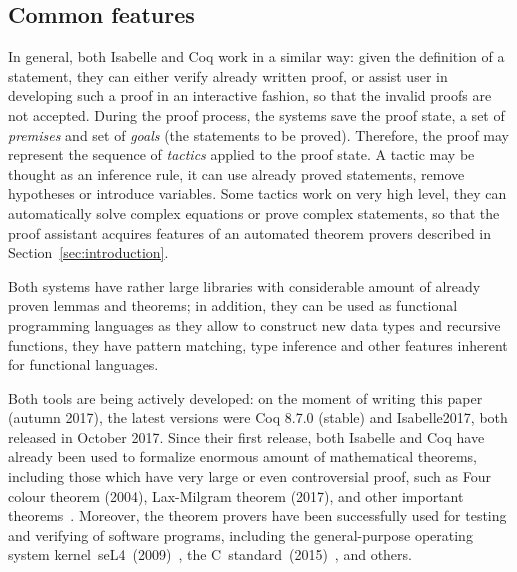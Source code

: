\documentclass[article]{aaltoseries}
\begin{document}


\subsection{Common features}

In general, both Isabelle and Coq work in a similar way: given the definition of a statement, they can either verify already written proof, or assist user in developing such a proof in an interactive fashion, so that the invalid proofs are not accepted.
During the proof process, the systems save the proof state, a set of \textit{premises} and set of \textit{goals} (the statements to be proved). Therefore, the proof may represent the sequence of \textit{tactics} applied to the proof state. A tactic may be thought as an inference rule, it can use already proved statements, remove hypotheses or introduce variables. Some tactics work on very high level, they can automatically solve complex equations or prove complex statements, so that the proof assistant acquires features of an automated theorem provers described in Section~\ref{sec:introduction}.

Both systems have rather large libraries with considerable amount of already proven lemmas and theorems; in addition, they can be used as functional programming languages as they allow to construct new data types and recursive functions, they have pattern matching, type inference and other features inherent for functional languages.

Both tools are being actively developed: on the moment of writing this paper (autumn 2017), the latest versions were Coq 8.7.0 (stable) and Isabelle2017, both released in October 2017. Since their first release, both Isabelle and Coq have already been used to formalize enormous amount of mathematical theorems, including those which have very large or even controversial proof, such as Four colour theorem (2004), Lax-Milgram theorem (2017), and other important theorems~\cite{Wiedijk100}. Moreover, the theorem provers have been successfully used for testing and verifying of software programs, including the general-purpose operating system kernel~seL4~(2009)~\cite{Klein09}, the C~standard~(2015)~\cite{Krebbers15}, and others.
\end{document}

